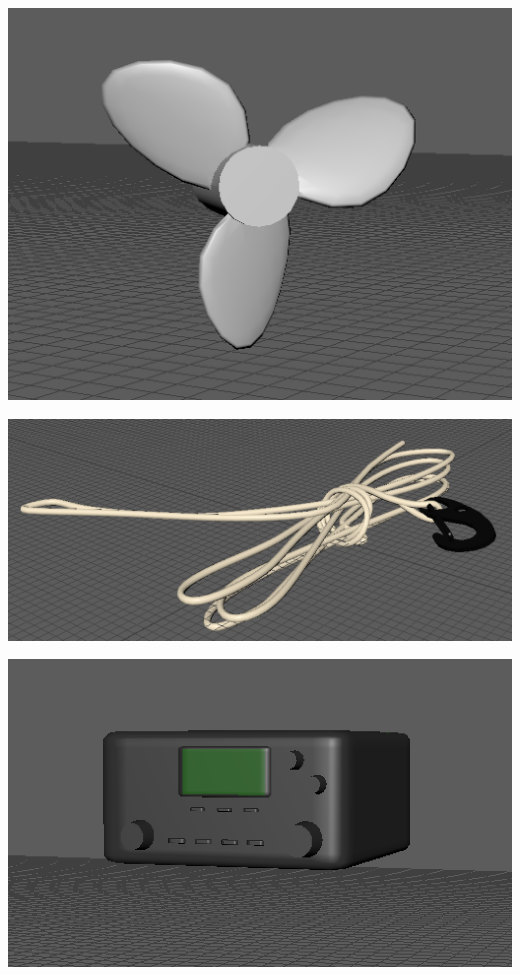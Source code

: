 \documentclass[ %
                    author={Elis Jones},
                supervisor={Dr. Kirsten Cater},
                    degree={BSc},
                     title={The Effect of Presentation Medium on Spatial Cognition},
                  subtitle={in the Virtual Environment},
                      year={2018} ]{dissertation}
\begin{document}
\begin{minipage}{\textwidth}
\begin{center}
\begin{minipage}{0.25\textwidth}
        \centering
        \includegraphics[width=1\textwidth]{images/prop.png}
    \end{minipage}\hfill
    \begin{minipage}{0.25\textwidth}
        \centering
        \includegraphics[width=1\textwidth]{images/tow.png}
    \end{minipage}\hfill
    \begin{minipage}{0.25\textwidth}
        \centering
        \includegraphics[width=1\textwidth]{images/vhf.png}
    \end{minipage}\hfill
\end{center}
\end{minipage}
\end{document}
